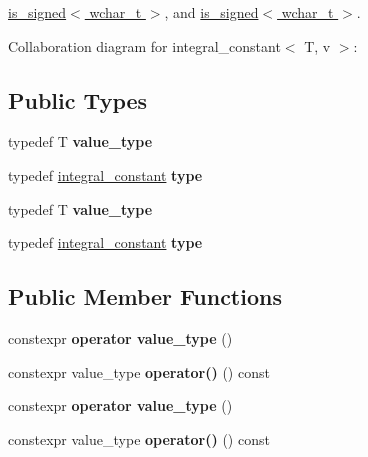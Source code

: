\hyperlink{structis__signed_3_01wchar__t_01_4}{is\+\_\+signed$<$ wchar\+\_\+t $>$}, and \hyperlink{structis__signed_3_01wchar__t_01_4}{is\+\_\+signed$<$ wchar\+\_\+t $>$}.



Collaboration diagram for integral\+\_\+constant$<$ T, v $>$\+:
\subsection*{Public Types}
\begin{DoxyCompactItemize}
\item 
typedef T {\bfseries value\+\_\+type}\hypertarget{structintegral__constant_a09382cbf2f3043d1a481eb5afcceb85e}{}\label{structintegral__constant_a09382cbf2f3043d1a481eb5afcceb85e}

\item 
typedef \hyperlink{structintegral__constant}{integral\+\_\+constant} {\bfseries type}\hypertarget{structintegral__constant_a3a7ac4a11d62e653a66a611a35e55345}{}\label{structintegral__constant_a3a7ac4a11d62e653a66a611a35e55345}

\item 
typedef T {\bfseries value\+\_\+type}\hypertarget{structintegral__constant_a09382cbf2f3043d1a481eb5afcceb85e}{}\label{structintegral__constant_a09382cbf2f3043d1a481eb5afcceb85e}

\item 
typedef \hyperlink{structintegral__constant}{integral\+\_\+constant} {\bfseries type}\hypertarget{structintegral__constant_a3a7ac4a11d62e653a66a611a35e55345}{}\label{structintegral__constant_a3a7ac4a11d62e653a66a611a35e55345}

\end{DoxyCompactItemize}
\subsection*{Public Member Functions}
\begin{DoxyCompactItemize}
\item 
constexpr {\bfseries operator value\+\_\+type} ()\hypertarget{structintegral__constant_a65e891f4ed7ff8350d59aaf39cc20e77}{}\label{structintegral__constant_a65e891f4ed7ff8350d59aaf39cc20e77}

\item 
constexpr value\+\_\+type {\bfseries operator()} () const \hypertarget{structintegral__constant_a7adad4ae5a136b0b4fa85f8a5b4a0954}{}\label{structintegral__constant_a7adad4ae5a136b0b4fa85f8a5b4a0954}

\item 
constexpr {\bfseries operator value\+\_\+type} ()\hypertarget{structintegral__constant_a65e891f4ed7ff8350d59aaf39cc20e77}{}\label{structintegral__constant_a65e891f4ed7ff8350d59aaf39cc20e77}

\item 
constexpr value\+\_\+type {\bfseries operator()} () const \hypertarget{structintegral__constant_a7adad4ae5a136b0b4fa85f8a5b4a0954}{}\label{structintegral__constant_a7adad4ae5a136b0b4fa85f8a5b4a0954}

\end{DoxyCompactItemize}

